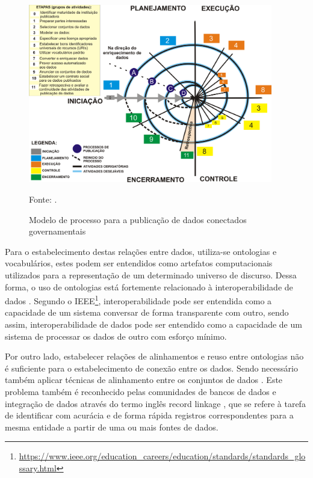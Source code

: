 \begin{figure}[!ht]
	\centering
	\includegraphics[width=0.95\textwidth]{./imagens/modelo-de-processo.png}\\
    \caption{Modelo de processo para a publicação de dados conectados governamentais}
	\footnotesize{Fonte: \cite{Avila2015}.}
	\label{fig:modelo_processo}
\end{figure}

Para o estabelecimento destas relações entre dados, utiliza-se ontologias e vocabulários, estes podem ser entendidos como artefatos computacionais utilizados para a representação de um determinado universo de discurso. Dessa forma, o uso de ontologias está fortemente relacionado à interoperabilidade de dados \cite{guarino1998formal} \cite{simon2004using} \cite{farinelli2013papel}. Segundo o IEEE\footnote{\url{https://www.ieee.org/education_careers/education/standards/standards_glossary.html}}, interoperabilidade pode ser entendida como a capacidade de um sistema conversar de forma transparente com outro, sendo assim, interoperabilidade de dados pode ser entendido como a capacidade de um sistema de processar os dados de outro com esforço mínimo. 

Por outro lado, estabelecer relações de alinhamentos e reuso entre ontologias não é suficiente para o estabelecimento de conexão entre os dados. Sendo necessário também aplicar técnicas de alinhamento entre os conjuntos de dados \cite{Castano2008}. Este problema também é reconhecido pelas comunidades de bancos de dados e integração de dados através do termo inglês record linkage \cite{gu2003record}, que se refere à tarefa de identificar com acurácia e de forma rápida registros correspondentes para a mesma entidade a partir de uma ou mais fontes de dados.

